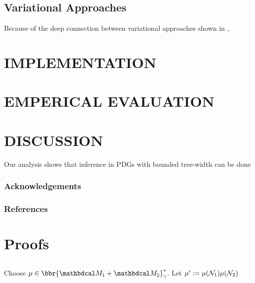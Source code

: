 \documentclass[twoside]{article}
\begin{document}
\subsection{Variational Approaches}

Because of the deep connection between variational approaches 
shown in \parencite{one-true-loss}, 



\section{IMPLEMENTATION}
\section{EMPERICAL EVALUATION}
\section{DISCUSSION}

Our analysis shows that inference in PDGs with bounded tree-width can be done 

\subsubsection*{Acknowledgements}

\subsubsection*{References}
\printbibliography


\clearpage
\onecolumn
\appendix
\section{Proofs}

\begin{lproof}\label{proof:main}
\end{lproof}

\subsection{}
\begin{lproof}
	Choose $\mu \in \bbr{\dg M_1 \bundle \dg M_2}^*_\gamma$.
	Let $\mu' := \mu(\mathcal N_1) \mu(\mathcal N_2)$
	
\end{lproof}
\end{document}
